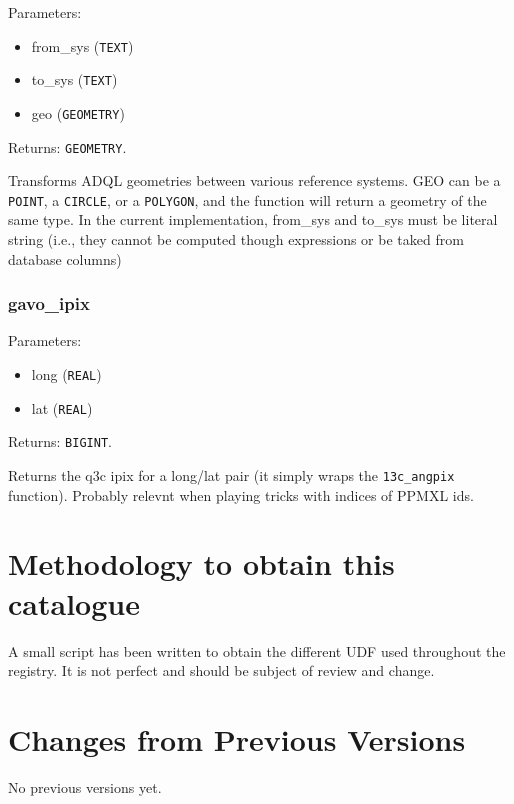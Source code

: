 \documentclass[11pt,a4paper]{ivoa}
\begin{document}
Parameters:

\begin{itemize}
	\item from\_sys (\texttt{TEXT})
	\item to\_sys (\texttt{TEXT})
	\item geo (\texttt{GEOMETRY})
\end{itemize}

Returns: \texttt{GEOMETRY}.

Transforms ADQL geometries between various reference systems. GEO can be
a \texttt{POINT}, a \texttt{CIRCLE}, or a \texttt{POLYGON}, and the
function will return a geometry of the same type. In the current
implementation, from\_sys and to\_sys must be literal string (i.e., they
cannot be computed though expressions or be taked from database columns)

\subsubsection{gavo\_ipix}

Parameters:

\begin{itemize}
	\item long (\texttt{REAL})
	\item lat (\texttt{REAL})
\end{itemize}

Returns: \texttt{BIGINT}.

Returns the q3c ipix for a long/lat pair (it simply wraps the
\texttt{13c\_angpix} function). Probably relevnt when playing tricks
with indices of PPMXL ids.

\appendix

\section{Methodology to obtain this catalogue}

A small script has been written to obtain the different UDF used
throughout the registry. It is not perfect and should be subject of
review and change.



\section{Changes from Previous Versions}

No previous versions yet.  



\end{document}
